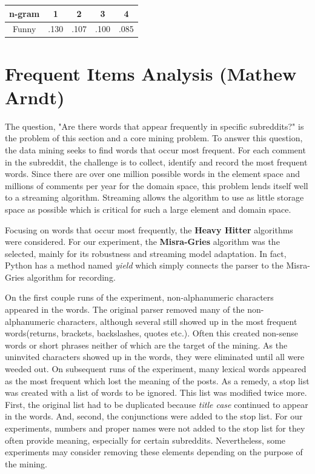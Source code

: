 \documentclass[12pt]{article}
\numberwithin{equation}{section}
\begin{document}
	\begin{table}[h!]
	  \begin{tabular}{c | c c c c}
	  n-gram & 1 & 2 & 3 & 4\\
	  \hline
	  Funny & .130 & .107 & .100 & .085\\
	  \end{tabular}
	\end{table}

\section*{Frequent Items Analysis (Mathew Arndt)}	
	
The question, "Are there words that appear frequently in specific subreddits?" is the problem of this section and a core mining problem.  To answer this question, the data mining seeks to find words that occur most frequent.  For each comment in the subreddit, the challenge is to collect, identify and record the most frequent words.  Since there are over one million possible words in the element space and millions of comments per year for the domain space, this problem lends itself well to a streaming algorithm.  Streaming allows the algorithm to use as little storage space as possible which is critical for such a large element and domain space.  

Focusing on words that occur most frequently, the \textbf{Heavy Hitter} algorithms were considered.  For our experiment, the \textbf{Misra-Gries} algorithm was the selected, mainly for its robustness and streaming model adaptation.  In fact, Python has a method named \textit{yield} which simply connects the parser to the Misra-Gries algorithm for recording.

On the first couple runs of the experiment, non-alphanumeric characters appeared in the words.  The original parser removed many of the non-alphanumeric characters, although several still showed up in the most frequent words(returns, brackets, backslashes, quotes etc.).  Often this created non-sense words or short phrases neither of which are the target of the mining.  As the uninvited characters showed up in the words, they were eliminated until all were weeded out.  On subsequent runs of the experiment, many lexical words appeared as the most frequent which lost the meaning of the posts.   As a remedy, a stop list was created with a list of words to be ignored.  This list was modified twice more.  First, the original list had to be duplicated because \textit{title case} continued to appear in the words.  And, second, the conjunctions were added to the stop list.  For our experiments, numbers and proper names were not added to the stop list for they often provide meaning, especially for certain subreddits.  Nevertheless, some experiments may consider removing these elements depending on the purpose of the mining.
\end{document}

